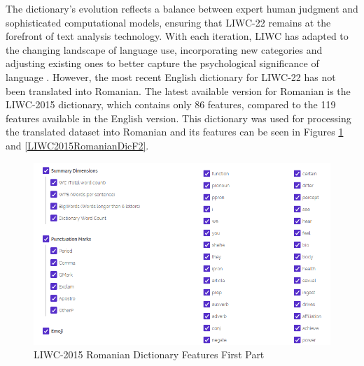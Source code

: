 The dictionary's evolution reflects a balance between expert human judgment and sophisticated computational models, ensuring that LIWC-22 remains at the forefront of text analysis technology. With each iteration, LIWC has adapted to the changing landscape of language use, incorporating new categories and adjusting existing ones to better capture the psychological significance of language \cite{boyd2022development}. However, the most recent English dictionary for LIWC-22 has not been translated into Romanian. The latest available version for Romanian is the LIWC-2015 dictionary, which contains only 86 features, compared to the 119 features available in the English version. This dictionary was used for processing the translated dataset into Romanian and its features can be seen in Figures \ref{LIWC2015RomanianDicF1} and \ref{LIWC2015RomanianDicF2}.


\begin{figure}[htbp]
	\centering
		\includegraphics[scale=0.65]{./figures/LIWC2015RomanianFeatures1.png}
	\caption{LIWC-2015 Romanian Dictionary Features First Part }
	\label{LIWC2015RomanianDicF1}
\end{figure}


